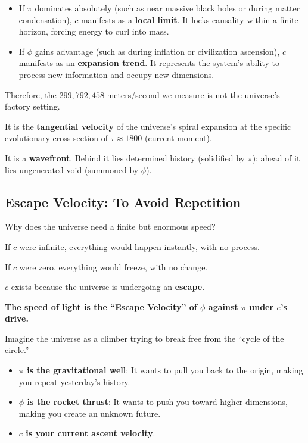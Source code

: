 \begin{itemize}
\item If $\pi$ dominates absolutely (such as near massive black holes or during matter condensation), $c$ manifests as a \textbf{local limit}. It locks causality within a finite horizon, forcing energy to curl into mass.

\item If $\phi$ gains advantage (such as during inflation or civilization ascension), $c$ manifests as an \textbf{expansion trend}. It represents the system's ability to process new information and occupy new dimensions.
\end{itemize}

Therefore, the $299,792,458$ meters/second we measure is not the universe's factory setting.

It is the \textbf{tangential velocity} of the universe's spiral expansion at the specific evolutionary cross-section of \textbf{$\tau \approx 1800$} (current moment).

It is a \textbf{wavefront}. Behind it lies determined history (solidified by $\pi$); ahead of it lies ungenerated void (summoned by $\phi$).

\subsection{Escape Velocity: To Avoid Repetition}

Why does the universe need a finite but enormous speed?

If $c$ were infinite, everything would happen instantly, with no process.

If $c$ were zero, everything would freeze, with no change.

$c$ exists because the universe is undergoing an \textbf{escape}.

\textbf{The speed of light is the ``Escape Velocity'' of $\phi$ against $\pi$ under $e$'s drive.}

Imagine the universe as a climber trying to break free from the ``cycle of the circle.''

\begin{itemize}
\item \textbf{$\pi$ is the gravitational well}: It wants to pull you back to the origin, making you repeat yesterday's history.

\item \textbf{$\phi$ is the rocket thrust}: It wants to push you toward higher dimensions, making you create an unknown future.

\item \textbf{$c$ is your current ascent velocity}.
\end{itemize}

